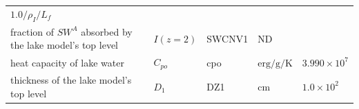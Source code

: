 \begin{longtable}[]{@{}lllll@{}}
\begin{minipage}[t]{0.17\columnwidth}
\(1.0 /\rho_I/L_f\)\strut
\end{minipage}\tabularnewline
\begin{minipage}[t]{0.33\columnwidth}\raggedright
fraction of \(SW^A\) absorbed by the lake model's top level\strut
\end{minipage} & \begin{minipage}[t]{0.19\columnwidth}\raggedright
\(I(z=2)\)\strut
\end{minipage} & \begin{minipage}[t]{0.06\columnwidth}\raggedright
SWCNV1\strut
\end{minipage} & \begin{minipage}[t]{0.12\columnwidth}\raggedright
\(\mathrm{ND}\)\strut
\end{minipage} & \begin{minipage}[t]{0.17\columnwidth}\raggedright
\strut
\end{minipage}\tabularnewline
\begin{minipage}[t]{0.33\columnwidth}\raggedright
heat capacity of lake water\strut
\end{minipage} & \begin{minipage}[t]{0.19\columnwidth}\raggedright
\(C_{po}\)\strut
\end{minipage} & \begin{minipage}[t]{0.06\columnwidth}\raggedright
cpo\strut
\end{minipage} & \begin{minipage}[t]{0.12\columnwidth}\raggedright
\(\mathrm{erg/g/K}\)\strut
\end{minipage} & \begin{minipage}[t]{0.17\columnwidth}\raggedright
\(3.990\times 10^7\)\strut
\end{minipage}\tabularnewline
\begin{minipage}[t]{0.33\columnwidth}\raggedright
thickness of the lake model's top level\strut
\end{minipage} & \begin{minipage}[t]{0.19\columnwidth}\raggedright
\(D_1\)\strut
\end{minipage} & \begin{minipage}[t]{0.06\columnwidth}\raggedright
DZ1\strut
\end{minipage} & \begin{minipage}[t]{0.12\columnwidth}\raggedright
\(\mathrm{cm}\)\strut
\end{minipage} & \begin{minipage}[t]{0.17\columnwidth}\raggedright
\(1.0\times 10^2\)\strut
\end{minipage}\tabularnewline
\bottomrule
\end{longtable}

